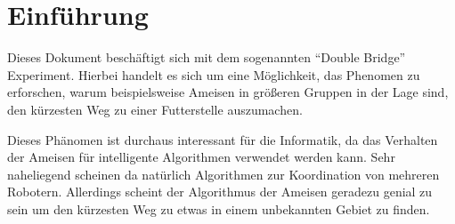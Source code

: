 
\section{Einführung}

Dieses Dokument beschäftigt sich mit dem sogenannten "`Double Bridge"'
Experiment. Hierbei handelt es sich um eine Möglichkeit, das Phenomen
zu erforschen, warum beispielsweise Ameisen in größeren Gruppen in der
Lage sind, den kürzesten Weg zu einer Futterstelle auszumachen.

Dieses Phänomen ist durchaus interessant für die Informatik, da das
Verhalten der Ameisen für intelligente Algorithmen verwendet werden
kann. Sehr naheliegend scheinen da natürlich Algorithmen zur
Koordination von mehreren Robotern. Allerdings scheint der Algorithmus
der Ameisen geradezu genial zu sein um den kürzesten Weg zu etwas in einem
unbekannten Gebiet zu finden.